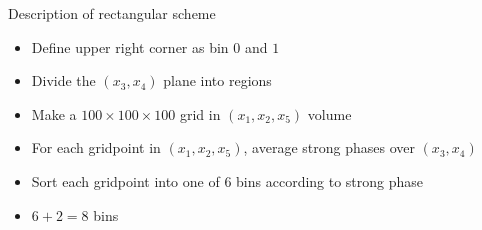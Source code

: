 \documentclass{beamer}
\begin{document}
\begin{frame}{Description of rectangular scheme}
  \begin{itemize}
    \item{Define upper right corner as bin $0$ and $1$}
    \item{Divide the $(x_3, x_4)$ plane into regions}
    \item{Make a $100\times 100\times 100$ grid in $(x_1, x_2, x_5)$ volume}
    \item{For each gridpoint in $(x_1, x_2, x_5)$, average strong phases over $(x_3, x_4)$}
    \item{Sort each gridpoint into one of $6$ bins according to strong phase}
    \item{$6 + 2 = 8$ bins}
  \end{itemize}
\end{frame}
\end{document}
